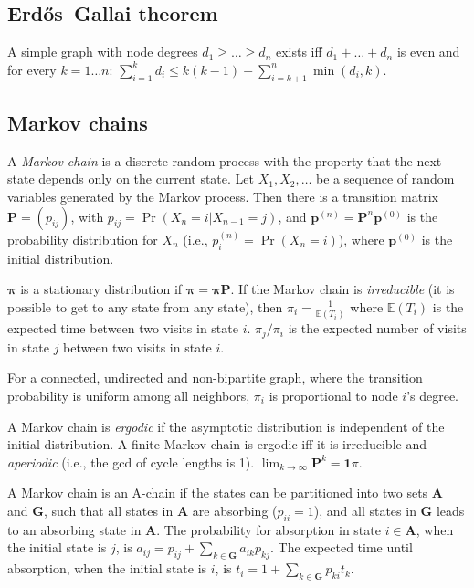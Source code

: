 	\subsection{Erdős–Gallai theorem}
		A simple graph with node degrees $d_1 \ge \dots \ge d_n$ exists iff $d_1 + \dots + d_n$ is even and for every $k = 1\dots n$:
		$\sum_{i=1}^{k}d_{i}\leq k(k-1)+\sum_{i=k+1}^{n}\min(d_{i},k)$.

	\subsection{Markov chains}
		A \emph{Markov chain} is a discrete random process with the property that the next state depends only on the current state.
		Let $X_1,X_2,\ldots$ be a sequence of random variables generated by the Markov process.
		Then there is a transition matrix $\mathbf{P} = (p_{ij})$, with $p_{ij} = \Pr(X_n = i | X_{n-1} = j)$,
		and $\mathbf{p}^{(n)} = \mathbf P^n \mathbf p^{(0)}$ is the probability distribution for $X_n$ (i.e., $p^{(n)}_i = \Pr(X_n = i)$),
		where $\mathbf{p}^{(0)}$ is the initial distribution.

		$\mathbf{\pi}$ is a stationary distribution if $\mathbf{\pi} = \mathbf{\pi P}$.
		If the Markov chain is \emph{irreducible} (it is possible to get to any state from any state),
		then $\pi_i = \frac{1}{\mathbb{E}(T_i)}$ where $\mathbb{E}(T_i)$  is the expected time between two visits in state $i$.
		$\pi_j/\pi_i$ is the expected number of visits in state $j$ between two visits in state $i$.

		For a connected, undirected and non-bipartite graph, where the transition probability is uniform among all neighbors, $\pi_i$ is proportional to node $i$'s degree.

		A Markov chain is \emph{ergodic} if the asymptotic distribution is independent of the initial distribution.
		A finite Markov chain is ergodic iff it is irreducible and \emph{aperiodic} (i.e., the gcd of cycle lengths is 1).
		$\lim_{k\rightarrow\infty}\mathbf{P}^k = \mathbf{1}\pi$.

		A Markov chain is an A-chain if the states can be partitioned into two sets $\mathbf{A}$ and $\mathbf{G}$, such that all states in $\mathbf{A}$ are absorbing ($p_{ii}=1$), and all states in $\mathbf{G}$ leads to an absorbing state in $\mathbf{A}$.
		The probability for absorption in state $i\in\mathbf{A}$, when the initial state is $j$, is $a_{ij} = p_{ij}+\sum_{k\in\mathbf{G}} a_{ik}p_{kj}$.
		The expected time until absorption, when the initial state is $i$, is $t_i = 1+\sum_{k\in\mathbf{G}}p_{ki}t_k$.

